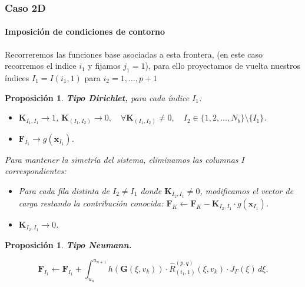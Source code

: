 \documentclass[compress]{beamer}
\newtheorem{proposition}[theorem]{Proposición}
\begin{document}
\begin{frame}
	\frametitle{Caso 2D}
	\framesubtitle{Imposición de condiciones de contorno}
	\tiny

	\vspace{-3pt}
	Recorreremos las funciones base asociadas a esta frontera, (en este caso recorremos el indice $i_1$ y fijamos $j_1=1$), para ello proyectamos de vuelta nuestros índices $I_{1}=I(i_1,1)$ para $i_2=1,\dots,p+1$
	
	\vspace{-3pt}
	\begin{proposition} \textbf{Tipo Dirichlet,} para cada índice $I_{1}$:
			\vspace{-3pt}
		\begin{itemize}
			\item $\mathbf{K}_{I_1,I_1} \rightarrow 1$, $\mathbf{K}_{(I_1,I_2)} \rightarrow 0, \quad \forall \mathbf{K}_{(I_1,I_2)} \neq 0, \quad I_2 \in \{1,2, \dots , N_b\} \setminus \{I_1\}$.
				\vspace{-3pt}
			\item $\mathbf{F}_{I_1} \rightarrow g(\mathbf{x}_{I_{1}})$.
		\end{itemize}
			\vspace{-3pt}
		Para mantener la simetría del sistema, eliminamos las columnas $I$ correspondientes:
			\vspace{-3pt}
		\begin{itemize}
			\item Para cada fila distinta de $I_2 \neq I_1$ donde $\mathbf{K}_{I_2,I_1} \neq 0$, modificamos el vector de carga restando la contribución conocida: $\mathbf{F}_K \leftarrow \mathbf{F}_K - \mathbf{K}_{I_2,I_1} \cdot g(\mathbf{x}_{I_1})$.
				\vspace{-3pt}
			\item $\mathbf{K}_{I_2,I_1} \rightarrow 0$.
		\end{itemize}
	\end{proposition}

		\vspace{-5pt}

	\begin{proposition} \textbf{Tipo Neumann.}

		\vspace{-10pt}
		\begin{equation*}
        	\mathbf{F}_{I_1} \leftarrow \mathbf{F}_{I_1} + \int_{u_n}^{u_{n+1}} h(\mathbf{G}(\xi, v_k)) \cdot \hat{R}_{(i_1,1)}^{(p,q)}(\xi, v_k) \cdot J_{\Gamma}(\xi) \, d\xi.
		\end{equation*}
	\end{proposition}


\end{frame}
\end{document}
